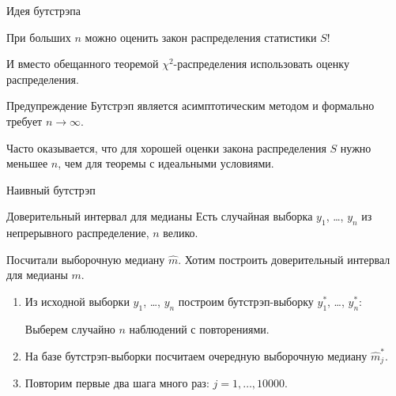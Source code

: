 \begin{frame}{Идея бутстрэпа}

  При больших $n$ можно \alert{оценить закон распределения} статистики $S$!

  \pause

  И вместо обещанного теоремой $\chi^2$-распределения \alert{использовать оценку распределения}.

  \pause

  \begin{block}{Предупреждение}
  Бутстрэп является асимптотическим методом и формально требует $n \to \infty$. 
  \end{block}

  \pause 

  Часто оказывается, что для хорошей оценки закона распределения $S$ нужно меньшее $n$, чем для теоремы с идеальными условиями.
\end{frame}





\begin{frame}{Наивный бутстрэп}

\begin{block}{Доверительный интервал для медианы}
Есть случайная выборка $y_1$, \ldots, $y_n$ из непрерывного распределение, $n$ велико. 

Посчитали выборочную медиану $\hat m$. Хотим построить доверительный интервал для медианы $m$. 
\end{block}

\pause
\begin{enumerate}[<+->]
  \item Из исходной выборки $y_1$, \ldots, $y_n$ построим бутстрэп-выборку $y^*_1$, \ldots, $y^*_n$:
  
  Выберем случайно $n$ наблюдений с повторениями. 
  \item На базе бутстрэп-выборки посчитаем очередную выборочную медиану $\hat m_j^*$.
  \item Повторим первые два шага много раз: $j = 1, \ldots, 10000$.
\end{enumerate}


\end{frame}


